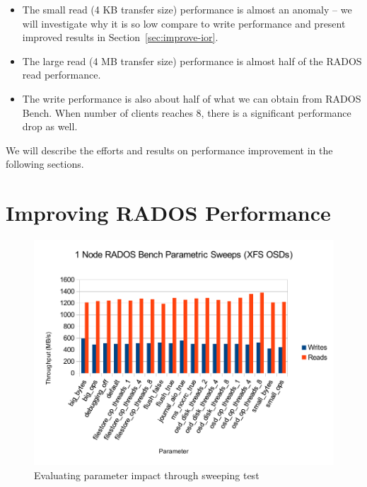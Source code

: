 \documentclass{article}
\begin{document}
\begin{itemize}

  \item The small read (4 KB transfer size) performance is almost an anomaly
  -- we will investigate why it is so low compare to write performance and
  present improved results in Section~\ref{sec:improve-ior}.

  \item The large read (4 MB transfer size) performance is almost half of the
  RADOS read performance.
   
  \item The write performance is also about half of what we can obtain from
  RADOS Bench. When number of clients reaches 8, there is a significant
  performance drop as well. 

\end{itemize}



We will describe the efforts and results on performance improvement in the
following sections.

\section{Improving RADOS Performance}

\begin{figure}[h]
\centering
\includegraphics[width=5in]{parametric}
\caption{Evaluating parameter impact through sweeping test}
\label{fig:parametric}
\end{figure}
\end{document}
